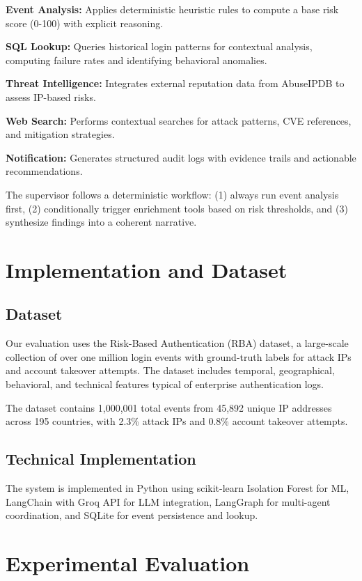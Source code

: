 \documentclass[11pt,twocolumn]{article}
\begin{document}
\textbf{Event Analysis:} Applies deterministic heuristic rules to compute a base risk score (0-100) with explicit reasoning.

\textbf{SQL Lookup:} Queries historical login patterns for contextual analysis, computing failure rates and identifying behavioral anomalies.

\textbf{Threat Intelligence:} Integrates external reputation data from AbuseIPDB to assess IP-based risks.

\textbf{Web Search:} Performs contextual searches for attack patterns, CVE references, and mitigation strategies.

\textbf{Notification:} Generates structured audit logs with evidence trails and actionable recommendations.

The supervisor follows a deterministic workflow: (1) always run event analysis first, (2) conditionally trigger enrichment tools based on risk thresholds, and (3) synthesize findings into a coherent narrative.

\section{Implementation and Dataset}

\subsection{Dataset}

Our evaluation uses the Risk-Based Authentication (RBA) dataset, a large-scale collection of over one million login events with ground-truth labels for attack IPs and account takeover attempts. The dataset includes temporal, geographical, behavioral, and technical features typical of enterprise authentication logs.

The dataset contains 1,000,001 total events from 45,892 unique IP addresses across 195 countries, with 2.3\% attack IPs and 0.8\% account takeover attempts.

\subsection{Technical Implementation}

The system is implemented in Python using scikit-learn Isolation Forest for ML, LangChain with Groq API for LLM integration, LangGraph for multi-agent coordination, and SQLite for event persistence and lookup.

\section{Experimental Evaluation}
\end{document}
